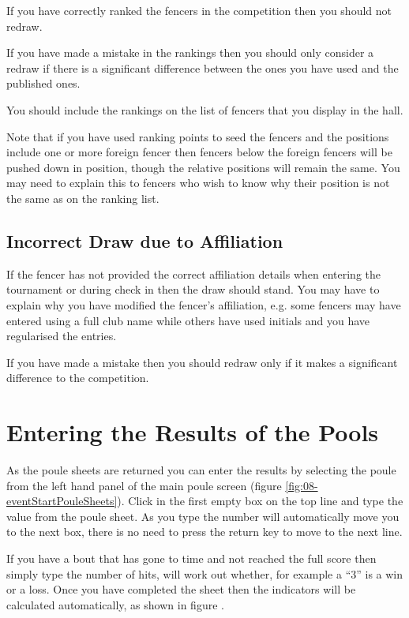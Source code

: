 \documentclass[a4paper,11pt]{memoir}
\begin{document}
If you have correctly ranked the fencers in the competition then you should not redraw. 

If you have made a mistake in the rankings then you should only consider a redraw if there is a significant difference between the ones you have used and the published ones.

You should include the rankings on the list of fencers that you display in the hall.

Note that if you have used ranking points to \gls{seed} the fencers and the positions include one or more foreign fencer then fencers below the foreign fencers will be pushed down in position, though the relative positions will remain the same. You may need to explain this to fencers who wish to know why their position is not the same as on the ranking list.  

\subsection{Incorrect Draw due to Affiliation}

If the fencer has not provided the correct affiliation details when entering the tournament or during check in then the draw should stand. 
You may have to explain why you have modified the fencer's affiliation, e.g. some fencers may have entered using a full club name while others have used initials and you have regularised the entries.

If you have made a mistake then you should redraw only if it makes a significant difference to the competition.

\section{Entering the Results of the Pools}

As the poule sheets are returned you can enter the results by selecting the poule from the left hand panel of the main poule screen (figure \ref{fig:08-eventStartPouleSheets}). Click in the first empty box on the top line and type the value from the poule sheet. As you type the number \fencingtime{} will automatically move you to the next box, there is no need to press the return key to move to the next line.

If you have a bout that has gone to time and not reached the full score then simply type the number of hits, \fencingtime{} will work out whether, for example a “3” is a win or a loss. Once you have completed the sheet then the \gls{indicators} will be calculated automatically, as shown in figure .
\end{document}
